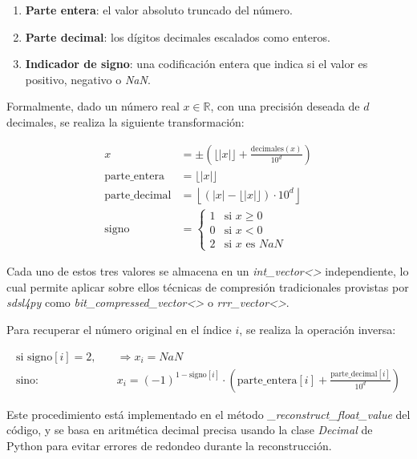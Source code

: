 \begin{enumerate}
    \item \textbf{Parte entera}: el valor absoluto truncado del número.
    \item \textbf{Parte decimal}: los dígitos decimales escalados como enteros.
    \item \textbf{Indicador de signo}: una codificación entera que indica si el valor es positivo, negativo o \textit{NaN}.
\end{enumerate}

Formalmente, dado un número real $x \in \mathbb{R}$, con una precisión deseada de $d$ decimales, se realiza la siguiente transformación:

\begin{align*}
    x &= \pm \left( \lfloor |x| \rfloor + \frac{\mathrm{decimales}(x)}{10^d} \right) \\
    \text{parte\_entera} &= \lfloor |x| \rfloor \\
    \text{parte\_decimal} &= \left\lfloor (|x| - \lfloor |x| \rfloor) \cdot 10^d \right\rfloor \\
    \text{signo} &=
        \begin{cases}
            1 & \text{si } x \geq 0 \\
            0 & \text{si } x < 0 \\
            2 & \text{si } x \text{ es } \textit{NaN}
        \end{cases}
\end{align*}

Cada uno de estos tres valores se almacena en un \textit{int\_vector<>} independiente, lo cual permite aplicar sobre ellos técnicas de compresión tradicionales provistas por \textit{sdsl4py} como \textit{bit\_compressed\_vector<>} o \textit{rrr\_vector<>}.

\vspace{1em}
\noindent
Para recuperar el número original en el índice $i$, se realiza la operación inversa:

\begin{align*}
    \text{si } \text{signo}[i] = 2, \quad &\Rightarrow x_i = \textit{NaN} \\
    \text{sino: } \quad &x_i = (-1)^{1 - \text{signo}[i]} \cdot \left( \text{parte\_entera}[i] + \frac{\text{parte\_decimal}[i]}{10^d} \right)
\end{align*}

\noindent
Este procedimiento está implementado en el método \textit{\_reconstruct\_float\_value} del código, y se basa en aritmética decimal precisa usando la clase \textit{Decimal} de Python para evitar errores de redondeo durante la reconstrucción.

